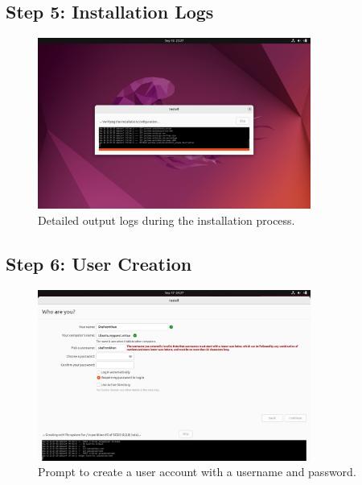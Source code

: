 \documentclass{article}
\begin{document}
\subsection{Step 5: Installation Logs}
\begin{figure}[H]
    \centering
    \includegraphics[width=0.8\textwidth]{2024-09-17_04-27-33.png}
    \caption{Detailed output logs during the installation process.}
\end{figure}

\subsection{Step 6: User Creation}
\begin{figure}[H]
    \centering
    \includegraphics[width=0.8\textwidth]{2024-09-17_04-28-05.png}
    \caption{Prompt to create a user account with a username and password.}
\end{figure}
\end{document}
